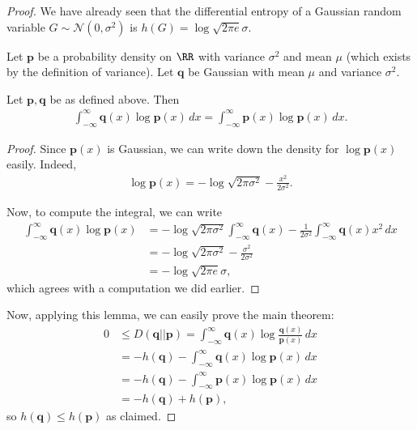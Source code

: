 \documentclass[13pt]{article}
\newcommand{\p}{\mathbf{p}}
\newcommand{\q}{\mathbf{q}}
\begin{document}
\begin{proof}
  We have already seen that the differential entropy of a Gaussian random variable  $G \sim \mathcal{N}(0, \sigma^2)$ is $h(G) = \log \sqrt{2 \pi e} \sigma$.

  Let $\p$ be a probability density on $\RR$ with variance $\sigma^2$ and mean $\mu$ (which exists by the definition of variance).  Let $\q$ be Gaussian with mean $\mu$ and variance $\sigma^2$.


  \begin{lemma}
    Let $\p, \q$ be as defined above.  Then
    \begin{align*}
      \int_{-\infty}^{\infty} \q(x) \log \p(x) \, dx = \int_{-\infty}^{\infty} \p(x) \log \p(x) \, dx.
    \end{align*}
  \end{lemma}

  \begin{proof}
    Since $\p(x)$ is Gaussian, we can write down the density for $\log \p(x)$ easily.  Indeed,
    \begin{align*}
      \log \p(x) = - \log \sqrt{2 \pi \sigma^2} - \frac{x^2}{2 \sigma^2}.
    \end{align*}

    Now, to compute the integral, we can write
    \begin{align*}
      \int_{-\infty}^{\infty} \q(x) \log \p(x) &= - \log \sqrt{2 \pi \sigma^2} \int_{- \infty}^{\infty} \q(x) - \frac{1}{2 \sigma^2} \int_{-\infty}^{\infty} \q(x) x^2 \, dx \\
      &=- \log \sqrt{2 \pi \sigma^2} - \frac{\sigma^2}{2\sigma^2} \\
      &= - \log \sqrt{2 \pi e} \sigma,
    \end{align*}
    which agrees with a computation we did earlier.
  \end{proof}

  Now, applying this lemma, we can easily prove the main theorem:
  \begin{align*}
    0 & \leq D (\q || \p) = \int_{- \infty}^{\infty} \q(x) \log \frac{\q(x)}{\p(x)} \, dx \\
    & = - h(\q) - \int_{- \infty}^{\infty} \q(x) \log \p(x) \, dx \\
    & = - h(\q) - \int_{-\infty}^{\infty} \p(x) \log \p(x) \, dx \\
    &= -h(\q) + h(\p),
  \end{align*}
  so $h(\q) \leq h(\p)$ as claimed.
\end{proof}
\end{document}
